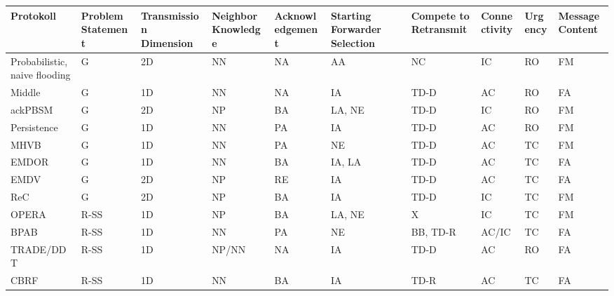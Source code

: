 \documentclass[english,runningheads,a4paper]{llncs}[2018/03/10]
\begin{document}
\begin{landscape}
\begin{table}[]
    \begin{tabular}{p{2cm}p{1.8cm}p{1.8cm}p{1.8cm}p{2.5cm}p{1.8cm}p{1.8cm}p{1.8cm}p{1.5cm}p{1.7cm}}
     \toprule
      Protokoll &  Problem \newline Statement & Transmission \newline Dimension &  Neighbor \newline Knowledge &  Acknowledgement &  Starting \newline Forwarder \newline Selection &  Compete to \newline Retransmit &  Connectivity &  Urgency &  Message \newline Content \\
     \midrule
     Probabilistic, naive flooding & G        & 2D & NN    & NA & AA     & NC       & IC    & RO & FM \\
    Middle                        & G        & 1D & NN    & NA & IA     & TD-D     & AC    & RO & FA \\
    ackPBSM                       & G        & 2D & NP    & BA & LA, NE & TD-D     & IC    & RO & FM \\
    Persistence                   & G        & 1D & NN    & PA & IA     & TD-D     & AC    & RO & FM \\
    MHVB                          & G        & 1D & NN    & PA & NE     & TD-D     & AC    & TC & FM \\
    EMDOR                         & G        & 1D & NN    & BA & IA, LA & TD-D     & AC    & TC & FA \\
    EMDV                          & G        & 2D & NP    & RE & IA     & TD-D     & AC    & TC & FA \\
    ReC                           & G        & 2D & NP    & BA & IA     & TD-D     & IC    & TC & FM \\
    OPERA                         & R-SS     & 1D & NP    & BA & LA, NE & X        & IC    & TC & FM \\
    BPAB                          & R-SS     & 1D & NN    & PA & NE     & BB, TD-R & AC/IC & TC & FA \\
    TRADE/DDT                     & R-SS     & 1D & NP/NN & NA & IA     & TD-D     & AC    & RO & FA \\
    CBRF                          & R-SS     & 1D & NN    & BA & IA     & TD-R     & AC    & TC & FA \\

\end{tabular}
\end{table}
\end{landscape}
\end{document}
